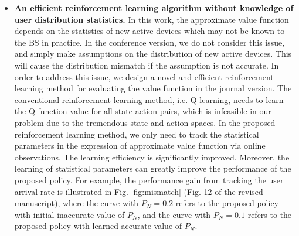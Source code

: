 \documentclass[12pt,onecolumn]{IEEEtran}
\begin{document}
{\begin{itemize}
\item \textbf{An efficient reinforcement learning algorithm without knowledge of user distribution statistics.} In this work, the approximate value function depends on the statistics of new active devices which may not be known to the BS in practice. In the conference version, we do not consider this issue, and simply make assumptions on the distribution of new active devices. This will cause the distribution mismatch if the assumption is not accurate. In order to address this issue, we design a novel and efficient reinforcement learning method for evaluating the value function in the journal version. The conventional reinforcement learning method, i.e. Q-learning, needs to learn the Q-function value for all state-action pairs, which is infeasible in our problem due to the tremendous state and action spaces. In the proposed reinforcement learning method, we only need to track the statistical parameters in the expression of approximate value function via online observations. The learning efficiency is significantly improved. Moreover, the learning of statistical parameters can greatly improve the performance of the proposed policy. For example, the performance gain from tracking the user arrival rate is illustrated in Fig. \ref{fig:mismatch} (Fig. 12 of the revised manuscript), where the curve with $P_N=0.2$ refers to the proposed policy with initial inaccurate value of $P_N$, and the curve with $P_N=0.1$ refers to the proposed policy with learned accurate value of $P_N$.
\end{itemize}
}
\end{document}
